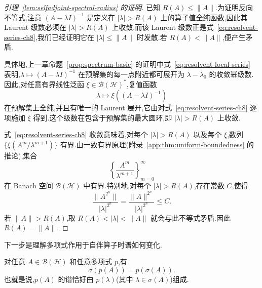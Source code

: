 \begin{proof}[引理~\ref{lem:selfadjoint-spectral-radius} 的证明]
已知 \(R(A)\leq\|A\|\).为证明反向不等式,注意 \((A-\lambda I)^{-1}\) 是定义在 \(|\lambda|>R(A)\) 上的算子值全纯函数,因此其 Laurent 级数必须在 \(|\lambda|>R(A)\) 上收敛.而该 Laurent 级数正是式~\eqref{eq:resolvent-series-ch8},我们已经证明它在 \(|\lambda|\leq\|A\|\) 时发散.若 \(R(A)<\|A\|\),便产生矛盾.

具体地,上一章命题~\ref{prop:spectrum-basic} 的证明中式~\eqref{eq:resolvent-local-series} 表明,\(\lambda\mapsto(A-\lambda I)^{-1}\) 在预解集的每一点附近都可展开为 \(\lambda-\lambda_{0}\) 的收敛幂级数.因此,对任意有界线性泛函 \(\xi\in\mathcal{B}(\mathcal{H})^{*}\),复值函数
\[
\lambda\longmapsto\xi((A-\lambda I)^{-1})
\]
在预解集上全纯,并且有唯一的 Laurent 展开,它由对式~\eqref{eq:resolvent-series-ch8} 逐项施加 \(\xi\) 得到.这个级数在包含于预解集的最大圆环,即 \(|\lambda|>R(A)\) 上收敛.

式~\eqref{eq:resolvent-series-ch8} 收敛意味着,对每个 \(|\lambda|>R(A)\) 以及每个 \(\xi\),数列 \(\{\xi(A^{m}/\lambda^{m+1})\}\) 有界.由一致有界原理(附录~\ref{app:thm:uniform-boundedness} 的推论),集合
\[
\left\{\frac{A^{m}}{\lambda^{m+1}}\right\}_{m=0}^{\infty}
\]
在 Banach 空间 \(\mathcal{B}(\mathcal{H})\) 中有界.特别地,对每个 \(|\lambda|>R(A)\),存在常数 \(C\),使得
\[
\frac{\|A^{2^{n}}\|}{|\lambda|^{2^{n}}}
=\frac{\|A\|^{2^{n}}}{|\lambda|^{2^{n}}}\leq C.
\]
若 \(\|A\|>R(A)\),取 \(R(A)<|\lambda|<\|A\|\) 就会与此不等式矛盾.因此 \(R(A)=\|A\|\).
\end{proof}

下一步是理解多项式作用于自伴算子时谱如何变化.

\begin{lemma}[谱映射定理]\label{lem:polynomial-spectral-mapping}
对任意 \(A\in\mathcal{B}(\mathcal{H})\) 和任意多项式 \(p\),有
\[
\sigma(p(A))=p(\sigma(A)).
\label{eq:polynomial-spectral-mapping}
\]
也就是说,\(p(A)\) 的谱恰好由 \(p(\lambda)\)(其中 \(\lambda\in\sigma(A)\))组成.
\end{lemma}


